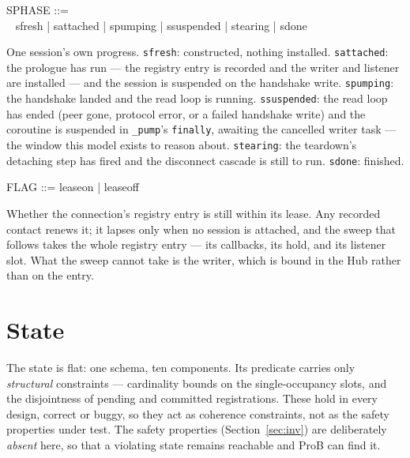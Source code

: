 \documentclass[a4paper,10pt,fleqn]{article}
\begin{document}
\begin{zed}
  SPHASE ::= \\
  \quad~ sfresh | sattached | spumping | ssuspended | stearing | sdone
\end{zed}

One session's own progress.  \texttt{sfresh}: constructed, nothing
installed.  \texttt{sattached}: the prologue has run --- the registry
entry is recorded and the writer and listener are installed --- and the
session is suspended on the handshake write.  \texttt{spumping}: the
handshake landed and the read loop is running.  \texttt{ssuspended}: the
read loop has ended (peer gone, protocol error, or a failed handshake
write) and the coroutine is suspended in \texttt{\_pump}'s
\texttt{finally}, awaiting the cancelled writer task --- the window this
model exists to reason about.  \texttt{stearing}: the teardown's
detaching step has fired and the disconnect cascade is still to run.
\texttt{sdone}: finished.

\begin{zed}
  FLAG ::= leaseon | leaseoff
\end{zed}

Whether the connection's registry entry is still within its lease.  Any
recorded contact renews it; it lapses only when no session is attached,
and the sweep that follows takes the whole registry entry --- its
callbacks, its hold, and its listener slot.  What the sweep cannot take
is the writer, which is bound in the Hub rather than on the entry.

\section{State}

The state is flat: one schema, ten components.  Its predicate carries
only \emph{structural} constraints --- cardinality bounds on the
single-occupancy slots, and the disjointness of pending and committed
registrations.  These hold in every design, correct or buggy, so they
act as coherence constraints, not as the safety properties under test.
The safety properties (Section~\ref{sec:inv}) are deliberately
\emph{absent} here, so that a violating state remains reachable and ProB
can find it.
\end{document}
